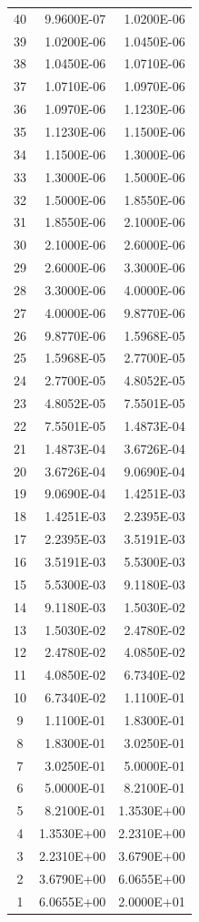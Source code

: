 \begin{appendices}
{\begin{longtable}[h!]{c r r}
		40 & 9.9600E-07 & 1.0200E-06 \\
		39 & 1.0200E-06 & 1.0450E-06 \\
		38 & 1.0450E-06 & 1.0710E-06 \\
		37 & 1.0710E-06 & 1.0970E-06 \\
		36 & 1.0970E-06 & 1.1230E-06 \\
		35 & 1.1230E-06 & 1.1500E-06 \\
		34 & 1.1500E-06 & 1.3000E-06 \\
		33 & 1.3000E-06 & 1.5000E-06 \\
		32 & 1.5000E-06 & 1.8550E-06 \\
		31 & 1.8550E-06 & 2.1000E-06 \\
		30 & 2.1000E-06 & 2.6000E-06 \\
		29 & 2.6000E-06 & 3.3000E-06 \\
		28 & 3.3000E-06 & 4.0000E-06 \\
		27 & 4.0000E-06 & 9.8770E-06 \\
		26 & 9.8770E-06 & 1.5968E-05 \\
		25 & 1.5968E-05 & 2.7700E-05 \\
		24 & 2.7700E-05 & 4.8052E-05 \\
		23 & 4.8052E-05 & 7.5501E-05 \\
		22 & 7.5501E-05 & 1.4873E-04 \\
		21 & 1.4873E-04 & 3.6726E-04 \\
		20 & 3.6726E-04 & 9.0690E-04 \\
		19 & 9.0690E-04 & 1.4251E-03 \\
		18 & 1.4251E-03 & 2.2395E-03 \\
		17 & 2.2395E-03 & 3.5191E-03 \\
		16 & 3.5191E-03 & 5.5300E-03 \\
		15 & 5.5300E-03 & 9.1180E-03 \\
		14 & 9.1180E-03 & 1.5030E-02 \\
		13 & 1.5030E-02 & 2.4780E-02 \\
		12 & 2.4780E-02 & 4.0850E-02 \\
		11 & 4.0850E-02 & 6.7340E-02 \\
		10 & 6.7340E-02 & 1.1100E-01 \\
		9 & 1.1100E-01 & 1.8300E-01 \\
		8 & 1.8300E-01 & 3.0250E-01 \\
		7 & 3.0250E-01 & 5.0000E-01 \\
		6 & 5.0000E-01 & 8.2100E-01 \\
		5 & 8.2100E-01 & 1.3530E+00 \\
		4 & 1.3530E+00 & 2.2310E+00 \\
		3 & 2.2310E+00 & 3.6790E+00 \\
		2 & 3.6790E+00 & 6.0655E+00 \\
		1 & 6.0655E+00 & 2.0000E+01 \\
		\bottomrule
	\end{longtable}
}


\end{appendices}

